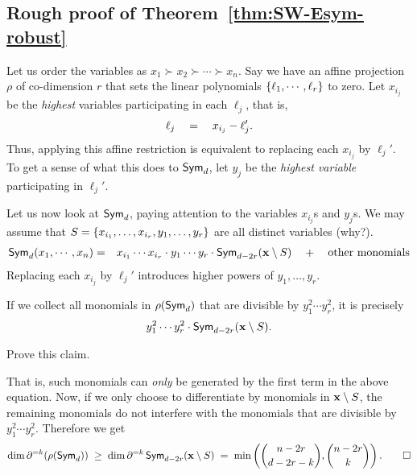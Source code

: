 \subsection{Rough proof of Theorem~\ref{thm:SW-Esym-robust}}

Let us order the variables as $x_1 \succ x_2 \succ \cdots \succ x_n$.
Say we have an affine projection $\rho$ of co-dimension $r$ that sets the linear polynomials $\left\{\ell_1,\cdots, \ell_r\right\}$ to zero. Let $x_{i_j}$ be the \emph{highest} variables participating in each $\ell_j$, that is,
\[
  \ell_j \quad = \quad x_{i_j} - \ell_j'.
\]
Thus, applying this affine restriction is equivalent to replacing each $x_{i_j}$ by $\ell_{j}'$. To get a sense of what this does to $\operatorname{\mathsf{Sym}}_d$, let $y_j$ be the \emph{highest variable} participating in $\ell_j'$.

Let us now look at $\operatorname{\mathsf{Sym}}_d$, paying attention to the variables $x_{i_j}$s and $y_j$s. We may assume that  $S = \left\{x_{i_1},\ldots, x_{i_r}, y_1,\ldots, y_r\right\}$ are all distinct variables (why?).
\begin{eqnarray*}
  \operatorname{\mathsf{Sym}}_d(x_1,\cdots, x_n) & = &  x_{i_1}\cdots x_{i_r}\cdot y_1\cdots y_r \cdot \operatorname{\mathsf{Sym}}_{d - 2r}(\mathbf{x} \setminus S) \quad + \quad \text{other monomials}
\end{eqnarray*}
Replacing each $x_{i_j}$ by $\ell_j'$ introduces higher powers of $y_1,\ldots, y_r$.

\begin{claim}
  If we collect all monomials in $\rho(\operatorname{\mathsf{Sym}}_d)$ that are divisible by $y_1^2\cdots y_r^2$, it is precisely
  \[
    y_1^2 \cdots y_r^2 \cdot \operatorname{\mathsf{Sym}}_{d-2r}(\mathbf{x} \setminus S).
  \]
\end{claim}

\begin{exercise}
Prove this claim. 
\end{exercise}

That is, such monomials can \emph{only} be generated by the first term in the above equation. Now, if we only choose to differentiate by monomials in $\mathbf{x} \setminus S$, the remaining monomials do not interfere with the monomials that are divisible by $y_1^2 \cdots y_r^2$. Therefore we get
\[
  \dim \partial^{=k}(\rho(\operatorname{\mathsf{Sym}}_d)) \;\geq\; \dim \partial^{=k}\operatorname{\mathsf{Sym}}_{d-2r}(\mathbf{x} \setminus S) \;=\; \min\left(\binom{n-2r}{d-2r-k}, \binom{n-2r}{k}\right).\qed
\]


